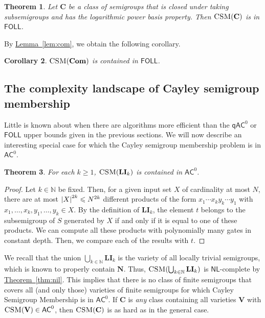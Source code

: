 \documentclass[11pt]{article}
\numberwithin{equation}{section}
\newtheorem{theorem}{Theorem}[section]
\newtheorem{corollary}[theorem]{Corollary}
\theoremstyle{definition}
\theoremstyle{plain}
\newcommand{\N}{\mathbb N}
\newcommand{\expref}[2]{\hyperref[#2]{#1~\ref{#2}}}
\renewcommand{\geq}{\geqslant}
\renewcommand{\leq}{\leqslant}
\renewcommand{\ge}{\geq}
\renewcommand{\le}{\leq}
\newcommand{\abs}[1]{\ensuremath\left|#1\right|}
\newcommand{\FOLL}{\ensuremath{\mathsf{FOLL}}}
\newcommand{\AC}{\ensuremath{\mathsf{AC}}}
\newcommand{\qAC}{\ensuremath{\mathsf{qAC}}}
\newcommand{\NL}{\ensuremath{\mathsf{NL}}}
\newcommand{\vC}{\mathbf{C}}
\newcommand{\vV}{\mathbf{V}}
\newcommand{\vNil}{\mathbf{N}}
\newcommand{\vLI}{\mathbf{LI}}
\newcommand{\vCom}{\mathbf{Com}}
\newcommand{\CSM}{\ensuremath{\textsc{CSM}}}
\newcommand{\SCSM}{Cayley semigroup membership}
\newcommand{\CCSM}{Cayley Semigroup Membership}
\newcommand{\SCSMP}{{\SCSM} problem}
\newcommand{\SLPBP}{logarithmic power basis property}
\begin{document}
\begin{theorem}
  Let $\vC$ be a class of semigroups that is closed under taking subsemigroups
  and has the {\SLPBP}.
  Then $\CSM(\vC)$ is in $\FOLL$.
  \label{thm:FOLL}
\end{theorem}


By \expref{Lemma}{lem:com}, we obtain the following corollary.

\begin{corollary}
  $\CSM(\vCom)$ is contained in $\FOLL$.
  \label{thm:Com-FOLL}
\end{corollary}

%
\subsection{The complexity landscape of {\SCSM}}  %

Little is known about when there are algorithms more efficient than the
$\qAC^0$ or $\FOLL$ upper bounds given in the previous sections.
%
We will now describe an interesting special case for which the
{\SCSMP} is in $\AC^0$.

\begin{theorem}
  For each $k \ge 1$, $\CSM(\vLI_k)$ is contained in $\AC^0$.
\end{theorem}
%
\begin{proof}
  Let $k \in \N$ be fixed.
  Then, for a given input set $X$ of cardinality at most $N$, there are at most
  $\abs{X}^{2k} \le N^{2k}$ different products of the form $x_1 \cdots x_k y_k
  \cdots y_1$ with $x_1, \dots, x_k, y_1, \dots, y_k \in X$.
  By the definition of $\vLI_k$, the element $t$ belongs to the subsemigroup
  of $S$ generated by $X$ if and only if it is equal to one of these products.
  We can compute all these products with polynomially many gates in constant
  depth. Then, we compare each of the results with $t$.
\end{proof}

We recall that the union $\bigcup_{k \in \N} \vLI_k$ is the variety of all
{locally trivial semigroups}, which is known to properly contain $\vNil$. Thus,
$\CSM(\bigcup_{k \in \N} \vLI_k)$ is $\NL$-complete by \expref{Theorem}{thm:nil}.
%
This implies that there is no class of finite semigroups that covers all (and
only those) varieties of finite semigroups for which {\CCSM} is in $\AC^0$.  If
$\vC$ is \emph{any} class containing all varieties $\vV$ with $\CSM(\vV) \in
\AC^0$, then $\CSM(\vC)$ is as hard as in the general case.
\end{document}
